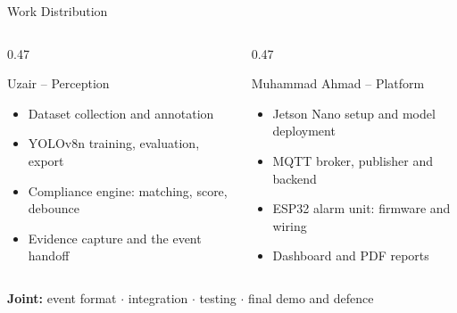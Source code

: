 \documentclass[aspectratio=169,10pt]{beamer}
\begin{document}
\begin{frame}{Work Distribution}
  \begin{columns}[T]
    \begin{column}{0.47\textwidth}
      \begin{block}{Uzair -- Perception}
        \small
        \begin{itemize}
          \item Dataset collection and annotation
          \item YOLOv8n training, evaluation, export
          \item Compliance engine: matching, score, debounce
          \item Evidence capture and the event handoff
        \end{itemize}
      \end{block}
    \end{column}
    \begin{column}{0.47\textwidth}
      \begin{block}{Muhammad Ahmad -- Platform}
        \small
        \begin{itemize}
          \item Jetson Nano setup and model deployment
          \item MQTT broker, publisher and backend
          \item ESP32 alarm unit: firmware and wiring
          \item Dashboard and PDF reports
        \end{itemize}
      \end{block}
    \end{column}
  \end{columns}
  \vspace{0.6em}
  \centering\small\textbf{Joint:} event format $\cdot$ integration $\cdot$ testing $\cdot$ final demo and defence
\end{frame}
\end{document}
